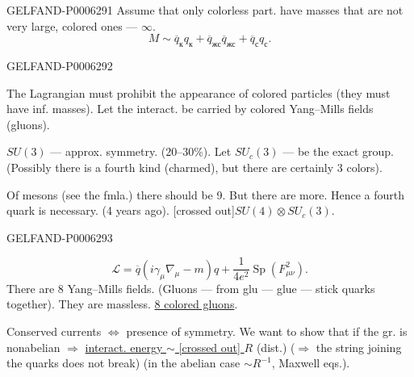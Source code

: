 \begin{GelfandAdjacentEvidence}{GELFAND-P000629}{1}
Assume that only colorless part. have masses that are not very large, colored ones --- \(\infty\).
\[
M\sim\overline q_{\text{к}}q_{\text{к}}+
\overline q_{\text{жс}}\overline q_{\text{жс}}+
\overline q_{\text{с}}q_{\text{с}}.
\]
\end{GelfandAdjacentEvidence}
\begin{GelfandAdjacentEvidence}{GELFAND-P000629}{2}

The Lagrangian must prohibit the appearance of colored particles (they must have inf. masses).
Let the interact. be carried by colored Yang--Mills fields (gluons).

\(SU(3)\) --- approx. symmetry. (\(20\)--\(30\%\)).
Let \(SU_c(3)\) --- be the exact group.
(Possibly there is a fourth kind (charmed), but there are certainly 3 colors).

Of mesons (see the fmla.) there should be 9. But there are more. Hence a fourth quark is necessary.
(4 years ago). [crossed out]\qquad \(SU(4)\otimes SU_c(3)\).
\end{GelfandAdjacentEvidence}
\begin{GelfandAdjacentEvidence}{GELFAND-P000629}{3}

\[
\mathcal L=\overline q(i\gamma_\mu\nabla_\mu-m)q+
\frac{1}{4e^2}\operatorname{Sp}(F_{\mu\nu}^2).
\]
There are 8 Yang--Mills fields. (Gluons --- from glu --- glue --- stick quarks together).
They are massless. \underline{8 colored gluons}.

Conserved currents \(\Longleftrightarrow\) presence of symmetry.
We want to show that if the gr. is nonabelian \(\Rightarrow\)
\underline{interact. energy \(\sim\) [crossed out] \(R\)} (dist.)
(\(\Rightarrow\) the string joining the quarks does not break)
(in the abelian case \(\sim R^{-1}\), Maxwell eqs.).
\end{GelfandAdjacentEvidence}

